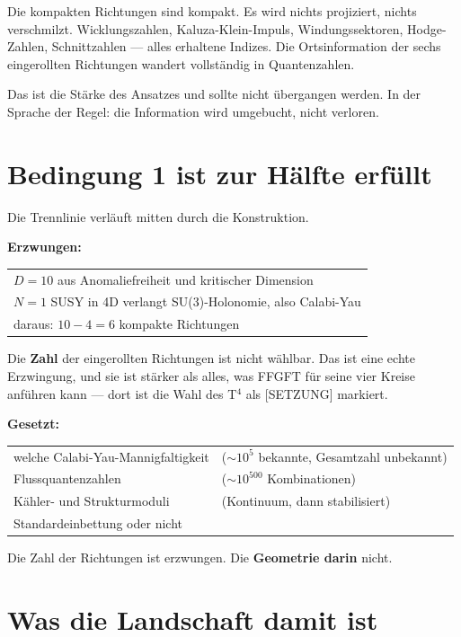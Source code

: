 Die kompakten Richtungen sind kompakt. Es wird nichts projiziert,
nichts verschmilzt. Wicklungszahlen, Kaluza-Klein-Impuls,
Windungssektoren, Hodge-Zahlen, Schnittzahlen --- alles erhaltene
Indizes. Die Ortsinformation der sechs eingerollten Richtungen wandert
vollständig in Quantenzahlen.

Das ist die Stärke des Ansatzes und sollte nicht übergangen werden. In
der Sprache der Regel: die Information wird umgebucht, nicht verloren.

\section{Bedingung 1 ist zur Hälfte erfüllt}

Die Trennlinie verläuft mitten durch die Konstruktion.

\textbf{Erzwungen:}
\begin{center}
\begin{tabular}{l}
$D = 10$ aus Anomaliefreiheit und kritischer Dimension \\
$N = 1$ SUSY in 4D verlangt SU(3)-Holonomie, also Calabi-Yau \\
daraus: $10 - 4 = 6$ kompakte Richtungen \\
\end{tabular}
\end{center}

Die \textbf{Zahl} der eingerollten Richtungen ist nicht wählbar. Das
ist eine echte Erzwingung, und sie ist stärker als alles, was FFGFT für
seine vier Kreise anführen kann --- dort ist die Wahl des T$^4$ als
[SETZUNG] markiert.

\textbf{Gesetzt:}
\begin{center}
\begin{tabular}{ll}
welche Calabi-Yau-Mannigfaltigkeit & ($\sim 10^5$ bekannte, Gesamtzahl unbekannt) \\
Flussquantenzahlen & ($\sim 10^{500}$ Kombinationen) \\
Kähler- und Strukturmoduli & (Kontinuum, dann stabilisiert) \\
Standardeinbettung oder nicht & \\
\end{tabular}
\end{center}

Die Zahl der Richtungen ist erzwungen. Die \textbf{Geometrie darin}
nicht.

\section{Was die Landschaft damit ist}

